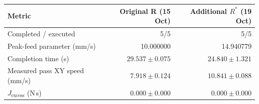 \begin{tabular}{lrr}
\toprule
Metric & Original R (15 Oct) & Additional $R^{*}$ (19 Oct) \\
\midrule
Completed / executed & 5/5 & 5/5 \\
Peak-feed parameter (mm/s) & 10.000000 & 14.940779 \\
Completion time (s) & $29.537 \pm 0.075$ & $24.840 \pm 1.321$ \\
Measured pass XY speed (mm/s) & $7.918 \pm 0.124$ & $10.841 \pm 0.088$ \\
$J_{\mathrm{excess}}$ (N\,s) & $0.000 \pm 0.000$ & $0.000 \pm 0.000$ \\
\bottomrule
\end{tabular}
